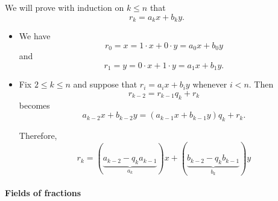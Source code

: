 \begin{defproof}
  We will prove with induction on \( k \leq n \) that
  \begin{equation*}
    r_k = a_k x + b_k y.
  \end{equation*}

  \begin{itemize}
    \item We have
    \begin{equation*}
      r_0 = x = 1 \cdot x + 0 \cdot y = a_0 x + b_0 y
    \end{equation*}
    and
    \begin{equation*}
      r_1 = y = 0 \cdot x + 1 \cdot y = a_1 x + b_1 y.
    \end{equation*}

    \item Fix \( 2 \leq k \leq n \) and suppose that \( r_i = a_i x + b_i y \) whenever \( i < n \). Then
    \begin{equation*}
      r_{k-2} = r_{k-1} q_k + r_k
    \end{equation*}
    becomes
    \begin{equation*}
      a_{k-2} x + b_{k-2} y = (a_{k-1} x + b_{k-1} y) q_k + r_k.
    \end{equation*}

    Therefore,
    \begin{equation*}
      r_k = (\underbrace{a_{k-2} - q_k a_{k-1}}_{a_k}) x + (\underbrace{b_{k-2} - q_k b_{k-1}}_{b_k}) y
    \end{equation*}
  \end{itemize}
\end{defproof}

\paragraph{Fields of fractions}

